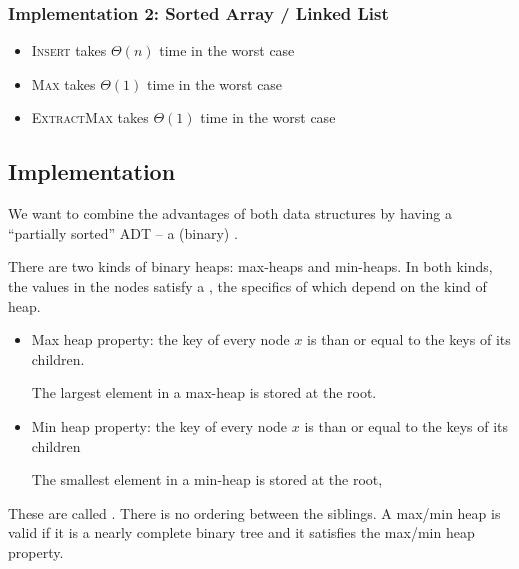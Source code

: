 \subsubsection{Implementation 2: Sorted Array / Linked List}

\begin{itemize}
    \item \textsc{Insert} takes $\Theta(n)$ time in the worst case 
    \item \textsc{Max} takes $\Theta(1)$ time in the worst case 
    \item \textsc{ExtractMax} takes $\Theta(1)$ time in the worst case
\end{itemize}

\subsection{Implementation}

We want to combine the advantages of both data structures by having a ``partially sorted'' ADT -- a (binary) . 

There are two kinds of binary heaps: max-heaps and min-heaps. In both kinds, the values in the nodes satisfy a , the specifics of which depend on the kind of heap. 

\begin{itemize}
    \item Max heap property: the key of every node $x$ is  than or equal to the keys of its children. 
    
    The largest element in a max-heap is stored at the root.
    
    \item Min heap property: the key of every node $x$ is  than or equal to the keys of its children
    
    The smallest element in a min-heap is stored at the root,
\end{itemize}

These are called . There is no ordering between the siblings. A max/min heap is valid if it is a nearly complete binary tree and it satisfies the max/min heap property.


